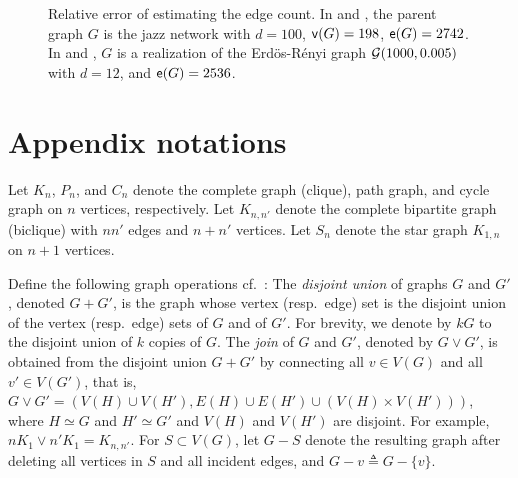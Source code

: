 \begin{figure}[H]
\caption{Relative error of estimating the edge count. In  and , the parent graph $G$ is the jazz network with $ d = 100 $, $ {\mathsf{v}}(G) = 198 $, $ {\mathsf{e}}(G) = 2742 $. In  and , $G$ is a realization of the Erd\"os-R\'enyi graph $ {\mathcal{G}}(1000, 0.005) $ with $ d = 12 $, and $ {\mathsf{e}}(G) = 2536 $.}
\label{fig:edge}
\end{figure}




\appendix

\section{Appendix notations}

Let $ K_{n} $, $ P_{n} $, and $ C_{n} $ denote the complete graph (clique), path graph, and cycle graph on $ n $ vertices, respectively. Let $ K_{n,n'} $ denote the complete bipartite graph (biclique) with $ n n' $ edges and $ n + n' $ vertices. Let $ S_{n} $ denote the star graph $ K_{1, n} $ on $ n+1 $ vertices.
%
%


Define the following graph operations cf.~\cite{west-book}:
The \emph{disjoint union} of graphs $G$ and $G'$, denoted $ G + G' $, is the graph whose vertex (resp.~edge) set is the disjoint union of the vertex (resp.~edge) sets of $G$ and of $G'$. For brevity, we denote by $ k G $ to the disjoint union of $ k $ copies of $ G $. The \emph{join} of $G$ and $G'$, denoted by $ G \vee G' $, is obtained from the disjoint union $G+G'$ by connecting all $v\in V(G)$ and all $v'\in V(G')$, that is, $G\vee G'= (V(H)\cup V(H'), E(H) \cup E(H') \cup (V(H) \times V(H')) ) $, where $H\simeq G$ and $H'\simeq G'$ and $V(H)$ and $V(H')$ are disjoint.
For example, $n K_1 \vee n' K_1 = K_{n,n'}$.
For $S\subset V(G)$, let $G-S$ denote the resulting graph after deleting all vertices in $S$ and all incident edges, and $G-v \triangleq G-\{v\}$.

